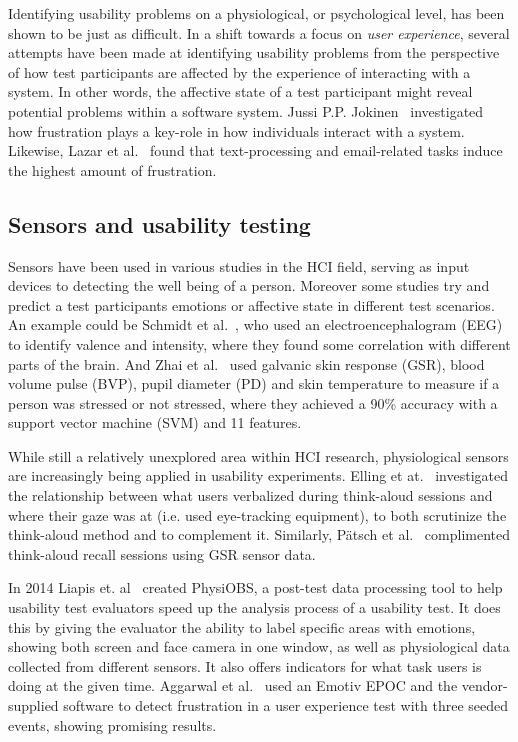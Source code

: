 Identifying usability problems on a physiological, or psychological level, has been shown to be just as difficult. In a
shift towards a focus on \textit{user experience}, several attempts have been made at identifying usability problems
from the perspective of how test participants are affected by the experience of interacting with a system. In other
words, the affective state of a test participant might reveal potential problems within a software system. Jussi
P.P. Jokinen~\cite{workplace_up_study} investigated how frustration plays a key-role in how individuals interact with a
system. Likewise, Lazar et al.~\cite{frustration_with_computers} found that text-processing and email-related tasks
induce the highest amount of frustration.

\subsection{Sensors and usability testing}
Sensors have been used in various studies in the HCI field, serving as input devices to detecting the well being of a person.
Moreover some studies try and predict a test participants emotions or affective state in different test scenarios. 
An example could be Schmidt et al.~\cite{schmidt_trainor}, who used an electroencephalogram (EEG) to identify valence and intensity, where they found some correlation with different parts of the brain.
And Zhai et al.~\cite{gsr_data_processing2} used galvanic skin response (GSR), blood volume pulse (BVP), pupil diameter (PD) and skin temperature to measure if a person was stressed or not stressed, where they achieved a 90\% accuracy with a support vector machine (SVM) and 11 features.

While still a relatively unexplored area within HCI research,
physiological sensors are increasingly being applied in usability experiments.
Elling et at.~\cite{concurrent_think_aloud_eye_tracking} investigated the
relationship between what users verbalized during think-aloud sessions and where
their gaze was at (i.e. used eye-tracking equipment), to both scrutinize the
think-aloud method and to complement it. Similarly, P\"{a}tsch et
al.~\cite{using_sensor_graphs_think_aloud} complimented think-aloud recall
sessions using GSR sensor data.

In 2014 Liapis et. al~\cite{fusion4} created PhysiOBS, a post-test data processing tool to help usability test evaluators speed up the analysis process of a usability test. It does this by giving the evaluator the ability to label specific areas with emotions, showing both screen and face camera in one window, as well as physiological data collected from different sensors. It also offers indicators for what task users is doing at the given time.
Aggarwal et al.~\cite{sensor_example} used an Emotiv EPOC and the vendor-supplied software to detect frustration in a
user experience test with three seeded events, showing promising results.

